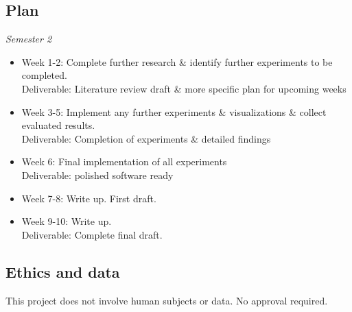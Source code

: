 \documentclass[11pt]{article}
\begin{document}
\subsection{Plan}\label{plan}

\emph{Semester 2}
\begin{itemize}
    \item Week 1-2: Complete further research \& identify further experiments to be
    completed.
    \\Deliverable: Literature review draft \& more specific plan for upcoming weeks
    \item Week 3-5: Implement any further experiments \& visualizations \& collect evaluated
    results.
    \\Deliverable: Completion of experiments \& detailed findings
    \item Week 6: Final implementation of all experiments
    \\Deliverable: polished software ready
    \item Week 7-8: Write up.
    First draft.
    \item Week 9-10: Write up.
    \\Deliverable: Complete final draft.
\end{itemize}

    
\subsection{Ethics and data}\label{ethics}
This project does not involve human subjects or data. No approval required.
\end{document}

